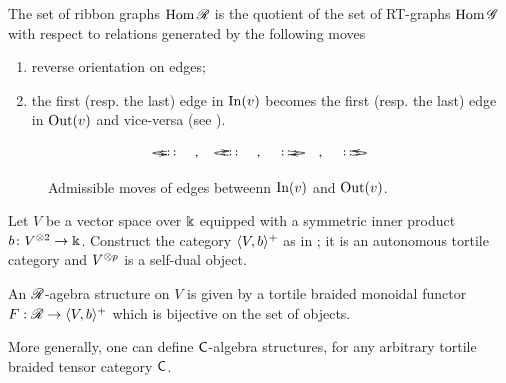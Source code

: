 \begin{lemma}
  The set of ribbon graphs $\operatorname{Hom}\mathscr{R}_{}$ is the quotient of the set of
  RT-graphs $\operatorname{Hom}\mathscr{G}_{}$ with respect to relations generated by the
  following moves
  \begin{enumerate}[(M1)]%
  \item \label{M3} reverse orientation on edges;
  \item \label{M4} the first (resp. the last) edge in $\operatorname{In}(v)$ becomes
    the first (resp. the last) edge in $\operatorname{Out}(v)$ and vice-versa (see
    ).
  \end{enumerate}
\end{lemma} 
\begin{figure}
  \begin{equation*}
    {%
      \xy*!LC\xybox{
        (0,1)*+[F]{\ };%
        (-1,0)**\dir{.},(-0.5,0)**\dir{-},%
        (0,0.5)*+{\ldots},(1,0)**\dir{-},%
        (-1,2)**\dir{-},(-0.5,2)**\dir{-},%
        (0,1.5)*+{\ldots},(1,2)**\dir{-},%
        \ar @/l1em/ (-.45,1.40);(-.45,0.50)
      }\endxy\quad,\quad\xy*!LC\xybox{
        (0,1)*+[F]{\ };%
        (-1,0)**\dir{-},(-0.5,0)**\dir{-},%
        (0,0.5)*+{\ldots},(1,0)**\dir{-},%
        (-1,2)**\dir{.},(-0.5,2)**\dir{-},%
        (0,1.5)*+{\ldots},(1,2)**\dir{-},%
        \ar @/l1em/ (-.45,0.40);(-.45,1.50)
      }\endxy\quad,\quad
      \xy*!LC\xybox{
        (0,1)*+[F]{\ };%
        (-1,0)**\dir{-},(0.5,0)**\dir{-},%
        (0,0.5)*+{\ldots},(1,0)**\dir{.},%
        (-1,2)**\dir{-},(0.5,2)**\dir{-},%
        (0,1.5)*+{\ldots},(1,2)**\dir{-},%
        \ar @/r1em/ (.45,1.40);(.45,0.50)
      }\endxy\quad,\quad\xy*!LC\xybox{
        (0,1)*+[F]{\ };%
        (-1,0)**\dir{-},(0.5,0)**\dir{-},%
        (0,0.5)*+{\ldots},(1,0)**\dir{-},%
        (-1,2)**\dir{-},(0.5,2)**\dir{-},%
        (0,1.5)*+{\ldots},(1,2)**\dir{.},%
        \ar @/r1em/ (.45,0.40);(.45,1.50)
      }\endxy
    }
  \end{equation*}
  \caption{Admissible moves of edges betweenn $\operatorname{In}(v)$ and $\operatorname{Out}(v)$.}
  \label{fig:moving-edges-in-out}
\end{figure}

Let $V$ be a vector space over $\Bbbk$ equipped with a symmetric inner
product $b\colon V\sp{\otimes 2} \to \Bbbk$. Construct the category $\langle V,b\rangle^+$ as
in ; it is an autonomous tortile category and
$V\sp{\otimes p}$ is a self-dual object.
\begin{definition}
  \label{dfn:rg-algebra}
  An $\mathscr{R}_{}$-agebra structure on $V$ is given by a tortile braided
  monoidal functor $F:\mathscr{R}_{} \to \langle V,b\rangle^+$ which is bijective on the set
  of objects.
\end{definition}
More generally, one can define $\mathsf{C}$-algebra structures, for
any arbitrary tortile braided tensor category $\mathsf{C}$.

